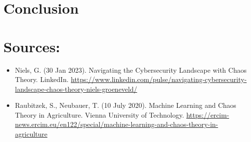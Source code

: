 \documentclass{article}
\begin{document}
\section*{}


\section*{Conclusion}

\newpage

\section*{Sources:}

\small
\begin{itemize}
    \sloppy
    \item Niels, G. (30 Jan 2023). Navigating the Cybersecurity Landscape with Chaos Theory. LinkedIn.
    \url{https://www.linkedin.com/pulse/navigating-cybersecurity-landscape-chaos-theory-niels-groeneveld/}
    \item Raubitzek, S., Neubauer, T. (10 July 2020). Machine Learning and Chaos Theory in Agriculture. Vienna University of Technology.
    \url{https://ercim-news.ercim.eu/en122/special/machine-learning-and-chaos-theory-in-agriculture} 
\end{itemize}
\end{document}
